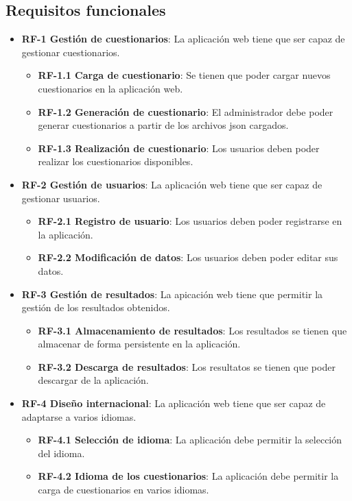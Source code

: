 \subsection{Requisitos funcionales}
\begin{itemize}
	\item \textbf{RF-1 Gestión de cuestionarios}: La aplicación web tiene que ser capaz de gestionar cuestionarios.
	\begin{itemize}
		\item \textbf{RF-1.1 Carga de cuestionario}: Se tienen que poder cargar nuevos cuestionarios en la aplicación web.
		\item \textbf{RF-1.2 Generación de cuestionario}: El administrador debe poder generar cuestionarios a partir de los archivos json cargados.
		\item \textbf{RF-1.3 Realización de cuestionario}: Los usuarios deben poder realizar los cuestionarios disponibles.
	\end{itemize}
	\item \textbf{RF-2 Gestión de usuarios}: La aplicación web tiene que ser capaz de gestionar usuarios.
		\begin{itemize}
		\item \textbf{RF-2.1 Registro de usuario}: Los usuarios deben poder registrarse en la aplicación.
		\item \textbf{RF-2.2 Modificación de datos}: Los usuarios deben poder editar sus datos.
	\end{itemize}
	\item \textbf{RF-3 Gestión de resultados}: La apicación web tiene que permitir la gestión de los resultados obtenidos.
		\begin{itemize}
		\item \textbf{RF-3.1 Almacenamiento de resultados}: Los resultados se tienen que almacenar de forma persistente en la aplicación.
		\item \textbf{RF-3.2 Descarga de resultados}: Los resultatos se tienen que poder descargar de la aplicación.
	\end{itemize}
	\item \textbf{RF-4 Diseño internacional}: La aplicación web tiene que ser capaz de adaptarse a varios idiomas.
		\begin{itemize}
		\item \textbf{RF-4.1 Selección de idioma}: La aplicación debe permitir la selección del idioma.
		\item \textbf{RF-4.2 Idioma de los cuestionarios}: La aplicación debe permitir la carga de cuestionarios en varios idiomas.
	\end{itemize}
\end{itemize}

